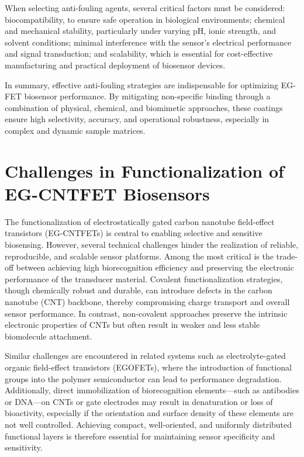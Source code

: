 When selecting anti-fouling agents, several critical factors must be considered: biocompatibility, to ensure safe operation in biological environments; chemical and mechanical stability, particularly under varying pH, ionic strength, and solvent conditions; minimal interference with the sensor's electrical performance and signal transduction; and scalability, which is essential for cost-effective manufacturing and practical deployment of biosensor devices.

In summary, effective anti-fouling strategies are indispensable for optimizing EG-FET biosensor performance. By mitigating non-specific binding through a combination of physical, chemical, and biomimetic approaches, these coatings ensure high selectivity, accuracy, and operational robustness, especially in complex and dynamic sample matrices.

\section{Challenges in Functionalization of EG-CNTFET Biosensors}

The functionalization of electrostatically gated carbon nanotube field-effect transistors (EG-CNTFETs) is central to enabling selective and sensitive biosensing. However, several technical challenges hinder the realization of reliable, reproducible, and scalable sensor platforms. Among the most critical is the trade-off between achieving high biorecognition efficiency and preserving the electronic performance of the transducer material. Covalent functionalization strategies, though chemically robust and durable, can introduce defects in the carbon nanotube (CNT) backbone, thereby compromising charge transport and overall sensor performance. In contrast, non-covalent approaches preserve the intrinsic electronic properties of CNTs but often result in weaker and less stable biomolecule attachment.

Similar challenges are encountered in related systems such as electrolyte-gated organic field-effect transistors (EGOFETs), where the introduction of functional groups into the polymer semiconductor can lead to performance degradation. Additionally, direct immobilization of biorecognition elements—such as antibodies or DNA—on CNTs or gate electrodes may result in denaturation or loss of bioactivity, especially if the orientation and surface density of these elements are not well controlled. Achieving compact, well-oriented, and uniformly distributed functional layers is therefore essential for maintaining sensor specificity and sensitivity.

